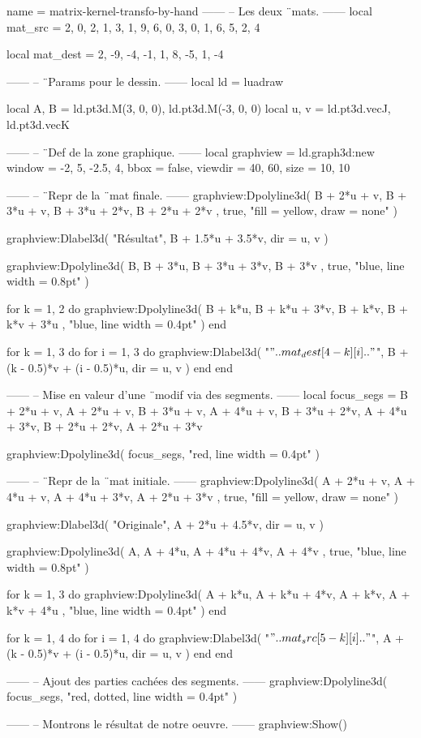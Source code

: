 \documentclass[border = 3pt]{standalone}
\begin{document}
\begin{luadraw*}{name = matrix-kernel-transfo-by-hand}
------
-- Les deux ¨mats.
------
local mat_src = {
  {2, 0, 2, 1},
  {3, 1, 9, 6},
  {0, 3, 0, 1},
  {6, 5, 2, 4}
}

local mat_dest = {
  {2, -9, -4},
  {-1, 1, 8},
  {-5, 1, -4}
}

------
-- ¨Params pour le dessin.
------
local ld = luadraw

local A, B = ld.pt3d.M(3, 0, 0), ld.pt3d.M(-3, 0, 0)
local u, v = ld.pt3d.vecJ, ld.pt3d.vecK

------
-- ¨Def de la zone graphique.
------
local graphview = ld.graph3d:new{
  window  = {-2, 5, -2.5, 4},
  bbox    = false,
  viewdir = {40, 60},
  size    = {10, 10}
}

------
-- ¨Repr de la ¨mat finale.
------
graphview:Dpolyline3d(
  {
    B + 2*u + v,
    B + 3*u + v,
    B + 3*u + 2*v,
    B + 2*u + 2*v
  },
  true,
  "fill = yellow, draw = none"
)

graphview:Dlabel3d(
  "Résultat", B + 1.5*u + 3.5*v,
  {
    dir = {u, v}
  }
)

graphview:Dpolyline3d(
  {
    B,
    B + 3*u,
    B + 3*u + 3*v,
    B + 3*v
  },
  true,
  "blue, line width = 0.8pt"
)

for k = 1, 2 do
  graphview:Dpolyline3d(
    {
      {B + k*u, B + k*u + 3*v},
      {B + k*v, B + k*v + 3*u}
    },
    "blue, line width = 0.4pt"
  )
end

for k = 1, 3 do
  for i = 1, 3 do
    graphview:Dlabel3d(
      "$" .. mat_dest[4 - k][i] .. "$",
      B + (k - 0.5)*v + (i - 0.5)*u,
      {
        dir = {u, v}
      }
    )
  end
end

------
-- Mise en valeur d'une ¨modif via des segments.
------
local focus_segs = {
  {B + 2*u + v, A + 2*u + v},
  {B + 3*u + v, A + 4*u + v},
  {B + 3*u + 2*v, A + 4*u + 3*v},
  {B + 2*u + 2*v, A + 2*u + 3*v}
}

graphview:Dpolyline3d(
  focus_segs,
  "red, line width = 0.4pt"
)

------
-- ¨Repr de la ¨mat initiale.
------
graphview:Dpolyline3d(
  {
    A + 2*u + v,
    A + 4*u + v,
    A + 4*u + 3*v,
    A + 2*u + 3*v
  },
  true,
  "fill = yellow, draw = none"
)

graphview:Dlabel3d(
  "Originale", A + 2*u + 4.5*v,
  {
    dir = {u, v}
  }
)

graphview:Dpolyline3d(
  {
    A,
    A + 4*u,
    A + 4*u + 4*v,
    A + 4*v
  },
  true,
  "blue, line width = 0.8pt"
)

for k = 1, 3 do
  graphview:Dpolyline3d(
    {
      {A + k*u, A + k*u + 4*v},
      {A + k*v, A + k*v + 4*u}
    },
    "blue, line width = 0.4pt"
  )
end

for k = 1, 4 do
  for i = 1, 4 do
    graphview:Dlabel3d(
      "$" .. mat_src[5 - k][i] .. "$",
      A + (k - 0.5)*v + (i - 0.5)*u,
      {
        dir = {u, v}
      }
    )
  end
end

------
-- Ajout des parties cachées des segments.
------
graphview:Dpolyline3d(
  focus_segs,
  "red, dotted, line width = 0.4pt"
)

------
-- Montrons le résultat de notre oeuvre.
------
graphview:Show()
\end{luadraw*}
\end{document}
